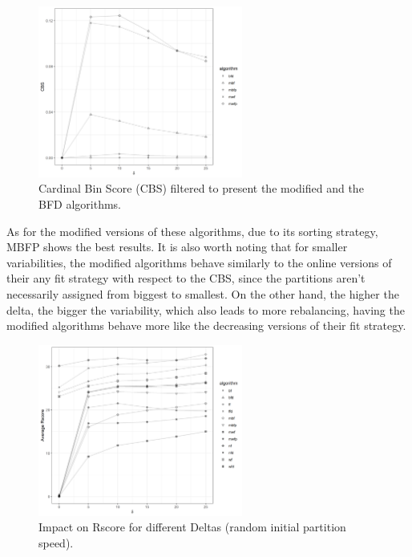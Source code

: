 \begin{figure}[htb!] 
\centering
\includegraphics[width=0.6\textwidth]{images/controller/filtered_relative.png} 
\caption{
    Cardinal Bin Score (CBS) filtered to present the modified and the
    BFD algorithms.
} 
\label{fig:relative_nconsumers_modified} 
\end{figure}

As for the modified versions of these algorithms, due to its sorting strategy,
MBFP shows the best results. It is also worth noting that for smaller
variabilities, the modified algorithms behave similarly to the online versions
of their any fit strategy with respect to the CBS, since the partitions aren't
necessarily assigned from biggest to smallest. On the other hand, the higher the
delta, the bigger the variability, which also leads to more rebalancing, having
the modified algorithms behave more like the decreasing versions of their fit
strategy.

\begin{figure}[htb!] 
    \centering
    \includegraphics[width=0.6\textwidth]{images/controller/Rscore.png}
    \caption{
        Impact on Rscore for different Deltas (random initial partition speed).
    } 
    \label{fig:rscore} 
\end{figure}

